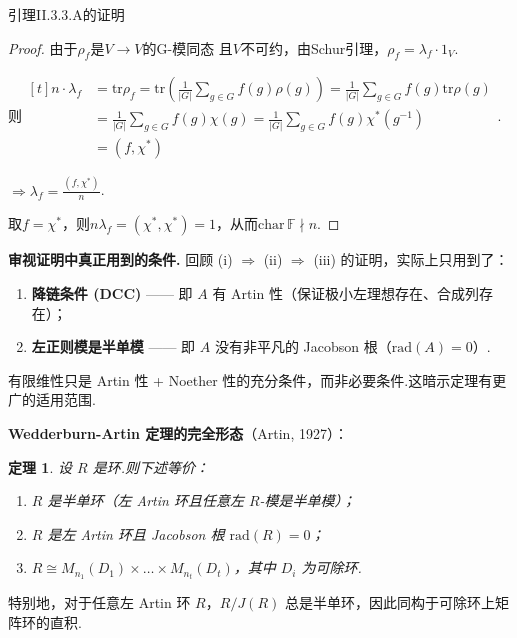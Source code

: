 \documentclass[11pt,a4paper]{article}
\theoremstyle{plain}
\newtheorem*{thm*}{定理}
\theoremstyle{definition}
\begin{document}
引理II.3.3.A的证明
\begin{proof}
    由于$\rho_f$是$V\to V$的G-模同态 且$V$不可约，由Schur引理，$\rho_f = \lambda_f\cdot 1_V$.\par
    则$\begin{aligned}[t]
         n\cdot \lambda_f &= \mathrm{tr}\rho_f = \mathrm{tr}\left(\frac{1}{|G|}\sum_{g\in G}f(g)\rho(g)\right) = \frac{1}{|G|}\sum_{g\in G}f(g)\mathrm{tr}\rho(g) \\
         &= \frac{1}{|G|}\sum_{g\in G}f(g)\chi(g) = \frac{1}{|G|}\sum_{g\in G}f(g)\chi^*(g^{-1})\\ 
         &= (f,\chi^*)
    \end{aligned}$.\par
    $\Rightarrow \lambda_f = \frac{(f,\chi^*)}{n}$.\par
    取$f=\chi^*$，则$n\lambda_f = (\chi^*,\chi^*) = 1$，从而$\mathrm{char}\,\mathbb{F}\nmid n$.
\end{proof}


\bigskip
\noindent \textbf{审视证明中真正用到的条件.} 回顾 (i) $\Rightarrow$ (ii) $\Rightarrow$ (iii) 的证明，实际上只用到了：

\begin{enumerate}
    \item \textbf{降链条件 (DCC)} —— 即 $A$ 有 Artin 性（保证极小左理想存在、合成列存在）；
    \item \textbf{左正则模是半单模} —— 即 $A$ 没有非平凡的 Jacobson 根（$\mathrm{rad}(A) = 0$）.
\end{enumerate}

有限维性只是 Artin 性 + Noether 性的充分条件，而非必要条件.这暗示定理有更广的适用范围.

\medskip
\noindent \textbf{Wedderburn-Artin 定理的完全形态}（Artin, 1927）：

\begin{thm*}
设 $R$ 是环.则下述等价：
\begin{enumerate}
    \item $R$ 是半单环（左 Artin 环且任意左 $R$-模是半单模）；
    \item $R$ 是左 Artin 环且 Jacobson 根 $\mathrm{rad}(R) = 0$；
    \item $R \cong M_{n_1}(D_1) \times \dots \times M_{n_t}(D_t)$，其中 $D_i$ 为可除环.
\end{enumerate}
\end{thm*}

特别地，对于任意左 Artin 环 $R$，$R/J(R)$ 总是半单环，因此同构于可除环上矩阵环的直积.
\end{document}
